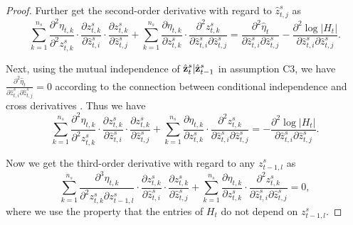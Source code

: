 \begin{proof}
    Further get the second-order derivative with regard to $\hat{z}_{t,j}^s$ as
    \begin{equation}
        \sum_{k=1}^{n_s}
        \frac{\partial^2 \eta_{t,k}}{\partial^2 z_{t,k}^s}\cdot
        \frac{\partial z_{t,k}^s}{\partial \hat{z}_{t,i}^s}\cdot
        \frac{\partial z_{t,k}^s}{\partial \hat{z}_{t,j}^s}
        +
        \sum_{k=1}^{n_s}
        \frac{\partial \eta_{t,k}}{\partial z_{t,k}^s}\cdot
        \frac{\partial^2 z_{t,k}^s}{\partial \hat{z}_{t,i}^s\partial \hat{z}_{t,j}^s}
        = 
        \frac{\partial^2 \hat{\mathbb{\eta}}_{t}}{\partial \hat{z}_{t,i}^s\partial \hat{z}_{t,j}^s}
        - 
        \frac{\partial^2 \log |H_t|}{\partial \hat{z}_{t,i}^s\partial \hat{z}_{t,j}^s}.
    \end{equation}

    Next, using the mutual independence of $\hat{{\mathbf{z}}}_t^s|\hat{{\mathbf{z}}}_{t-1}^s$ in assumption C3, we have $\frac{\partial^2 \hat{\mathbb{\eta}}_{t}}{\partial \hat{z}_{t,i}^s\partial \hat{z}_{t,j}^s}=0$ according to the connection between conditional independence and cross derivatives \citep{lin1997factorizing}. Thus we have
    \begin{equation}
        \sum_{k=1}^{n_s}
        \frac{\partial^2 \eta_{t,k}}{\partial^2 z_{t,k}^s}\cdot
        \frac{\partial z_{t,k}^s}{\partial \hat{z}_{t,i}^s}\cdot
        \frac{\partial z_{t,k}^s}{\partial \hat{z}_{t,j}^s}
        +
        \sum_{k=1}^{n_s}
        \frac{\partial \eta_{t,k}}{\partial z_{t,k}^s}\cdot
        \frac{\partial^2 z_{t,k}^s}{\partial \hat{z}_{t,i}^s\partial \hat{z}_{t,j}^s}
        = 
        - 
        \frac{\partial^2 \log |H_t|}{\partial \hat{z}_{t,i}^s\partial \hat{z}_{t,j}^s}.
    \end{equation}

    Now we get the third-order derivative with regard to any $z_{t-1,l}^s$ as
    \begin{equation}
    \label{ap_eq: always 0}
        \sum_{k=1}^{n_s}
        \frac{\partial^3 \eta_{t,k}}{\partial^2 z_{t,k}^s\partial z_{t-1,l}^s}\cdot
        \frac{\partial z_{t,k}^s}{\partial \hat{z}_{t,i}^s}\cdot
        \frac{\partial z_{t,k}^s}{\partial \hat{z}_{t,j}^s}
        +
        \sum_{k=1}^{n_s}
        \frac{\partial \eta_{t,k}}{\partial z_{t,k}^s}\cdot
        \frac{\partial^2 z_{t,k}^s}{\partial \hat{z}_{t,i}^s\partial \hat{z}_{t,j}^s}
        = 
        0,
    \end{equation}
    where we use the property that the entries of $H_t$ do not depend on $z_{t-1,l}^s$.


\end{proof}
